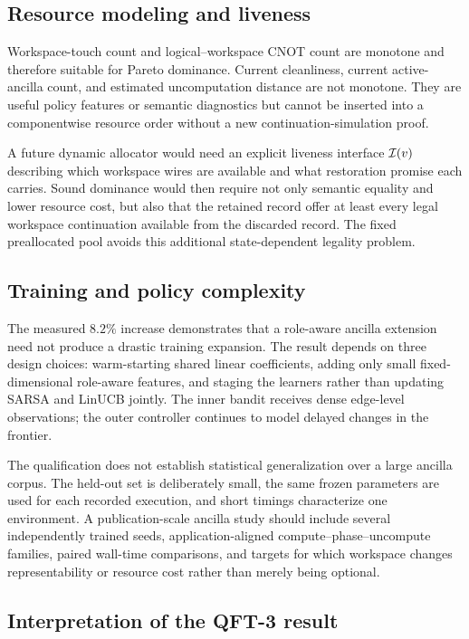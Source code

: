 \subsection{Resource modeling and liveness}

Workspace-touch count and logical--workspace CNOT count are monotone and therefore suitable for Pareto dominance. Current cleanliness, current active-ancilla count, and estimated uncomputation distance are not monotone. They are useful policy features or semantic diagnostics but cannot be inserted into a componentwise resource order without a new continuation-simulation proof.

A future dynamic allocator would need an explicit liveness interface $\mathcal{I}(v)$ describing which workspace wires are available and what restoration promise each carries. Sound dominance would then require not only semantic equality and lower resource cost, but also that the retained record offer at least every legal workspace continuation available from the discarded record. The fixed preallocated pool avoids this additional state-dependent legality problem.

\subsection{Training and policy complexity}

The measured $8.2\%$ increase demonstrates that a role-aware ancilla extension need not produce a drastic training expansion. The result depends on three design choices: warm-starting shared linear coefficients, adding only small fixed-dimensional role-aware features, and staging the learners rather than updating SARSA and LinUCB jointly. The inner bandit receives dense edge-level observations; the outer controller continues to model delayed changes in the frontier.

The qualification does not establish statistical generalization over a large ancilla corpus. The held-out set is deliberately small, the same frozen parameters are used for each recorded execution, and short timings characterize one environment. A publication-scale ancilla study should include several independently trained seeds, application-aligned compute--phase--uncompute families, paired wall-time comparisons, and targets for which workspace changes representability or resource cost rather than merely being optional.

\subsection{Interpretation of the QFT-3 result}

